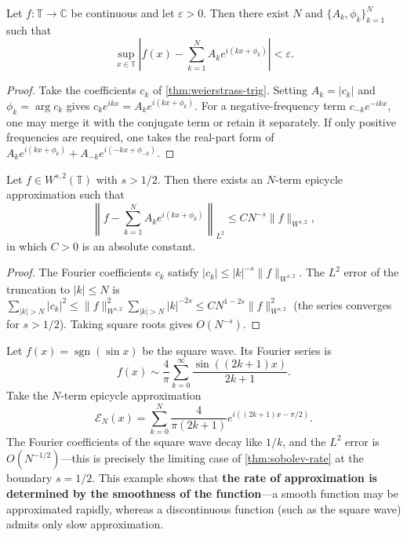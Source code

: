 \begin{corollary}\label{cor:epicycle-periodic-approx}
Let $f:\mathbb T\to\mathbb C$ be continuous and let $\varepsilon>0$. Then there exist $N$ and $\{A_k,\phi_k\}_{k=1}^{N}$ such that
\[
\sup_{x\in\mathbb T}\left|f(x)-\sum_{k=1}^{N}A_k e^{i(kx+\phi_k)}\right|<\varepsilon.
\]
\end{corollary}

\begin{proof}
Take the coefficients $c_k$ of \cref{thm:weierstrass-trig}. Setting $A_k=|c_k|$ and $\phi_k=\arg c_k$ gives $c_k e^{ikx}=A_k e^{i(kx+\phi_k)}$. For a negative-frequency term $c_{-k}e^{-ikx}$, one may merge it with the conjugate term or retain it separately. If only positive frequencies are required, one takes the real-part form of $A_k e^{i(kx+\phi_k)}+A_{-k}e^{i(-kx+\phi_{-k})}$.
\end{proof}

\begin{theorem}\label{thm:sobolev-rate}
Let $f\in W^{s,2}(\mathbb T)$ with $s>1/2$. Then there exists an $N$-term epicycle approximation such that
\[
\left\|f-\sum_{k=1}^{N}A_k e^{i(kx+\phi_k)}\right\|_{L^2}\le C N^{-s}\|f\|_{W^{s,2}},
\]
in which $C>0$ is an absolute constant.
\end{theorem}

\begin{proof}
The Fourier coefficients $c_k$ satisfy $|c_k|\le |k|^{-s}\|f\|_{W^{s,2}}$. The $L^2$ error of the truncation to $|k|\le N$ is $\sum_{|k|>N}|c_k|^2\le \|f\|_{W^{s,2}}^2\sum_{|k|>N}|k|^{-2s}\le C N^{1-2s}\|f\|_{W^{s,2}}^2$ (the series converges for $s>1/2$). Taking square roots gives $O(N^{-s})$.
\end{proof}

\begin{example}\label{ex:square-wave-approx}
Let $f(x)=\operatorname{sgn}(\sin x)$ be the square wave. Its Fourier series is
\[
f(x)\sim \frac{4}{\pi}\sum_{k=0}^{\infty}\frac{\sin((2k+1)x)}{2k+1}.
\]
Take the $N$-term epicycle approximation
\[
\mathcal E_N(x)=\sum_{k=0}^{N}\frac{4}{\pi(2k+1)}e^{i((2k+1)x-\pi/2)}.
\]
The Fourier coefficients of the square wave decay like $1/k$, and the $L^2$ error is $O(N^{-1/2})$---this is precisely the limiting case of \cref{thm:sobolev-rate} at the boundary $s=1/2$. This example shows that \textbf{the rate of approximation is determined by the smoothness of the function}---a smooth function may be approximated rapidly, whereas a discontinuous function (such as the square wave) admits only slow approximation.
\end{example}

